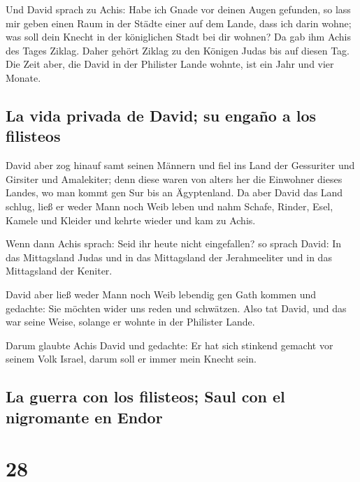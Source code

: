  Und David sprach zu Achis: Habe ich Gnade vor deinen
Augen gefunden, so lass mir geben einen Raum in der Städte einer auf dem
Lande, dass ich darin wohne; was soll dein Knecht in der königlichen
Stadt bei dir wohnen?  Da gab ihm Achis des Tages Ziklag.
Daher gehört Ziklag zu den Königen Judas bis auf diesen Tag.
 Die Zeit aber, die David in der Philister Lande wohnte,
ist ein Jahr und vier Monate.

\hypertarget{la-vida-privada-de-david-su-engauxf1o-a-los-filisteos}{%
\subsection{La vida privada de David; su engaño a los
filisteos}\label{la-vida-privada-de-david-su-engauxf1o-a-los-filisteos}}

 David aber zog hinauf samt seinen Männern und fiel ins
Land der Gessuriter und Girsiter und Amalekiter; denn diese waren von
alters her die Einwohner dieses Landes, wo man kommt gen Sur bis an
Ägyptenland.  Da aber David das Land schlug, ließ er weder
Mann noch Weib leben und nahm Schafe, Rinder, Esel, Kamele und Kleider
und kehrte wieder und kam zu Achis.

 Wenn dann Achis sprach: Seid ihr heute nicht
eingefallen? so sprach David: In das Mittagsland Judas und in das
Mittagsland der Jerahmeeliter und in das Mittagsland der Keniter.

 David aber ließ weder Mann noch Weib lebendig gen Gath
kommen und gedachte: Sie möchten wider uns reden und schwätzen. Also tat
David, und das war seine Weise, solange er wohnte in der Philister
Lande.

 Darum glaubte Achis David und gedachte: Er hat sich
stinkend gemacht vor seinem Volk Israel, darum soll er immer mein Knecht
sein.

\hypertarget{la-guerra-con-los-filisteos-saul-con-el-nigromante-en-endor}{%
\subsection{La guerra con los filisteos; Saul con el nigromante en
Endor}\label{la-guerra-con-los-filisteos-saul-con-el-nigromante-en-endor}}

\hypertarget{section-27}{%
\section{28}\label{section-27}}

